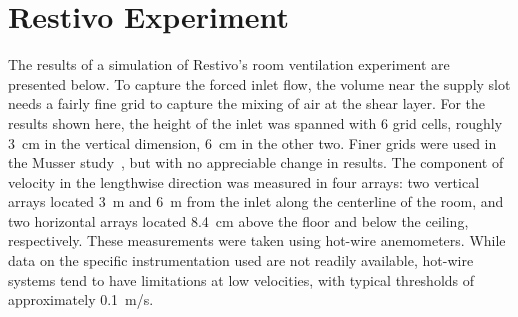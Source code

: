 




\clearpage

\section{Restivo Experiment}

The results of a simulation of Restivo's room ventilation experiment are presented below.
To capture the forced inlet flow, the volume near the supply slot needs a fairly
fine grid to capture the mixing of air at the shear layer. For the results shown here, the height of the inlet
was spanned with 6 grid cells, roughly 3~cm in the vertical dimension, 6~cm in the other two. Finer grids
were used in the Musser study~\cite{Musser:1}, but with no appreciable change in results. The component
of velocity in the lengthwise direction was measured in four arrays: two vertical arrays located 3~m and 6~m  from the inlet along the
centerline of the room, and two horizontal arrays located 8.4~cm above the floor and below the ceiling, respectively.
These measurements were taken using hot-wire anemometers. While data on the specific
instrumentation used are not readily available, hot-wire systems tend to have limitations at low velocities,
with typical thresholds of approximately 0.1~m/s.

